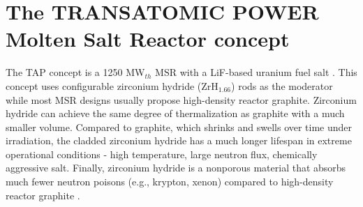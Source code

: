 \documentclass[12pt]{article} %
\begin{document}
\section{The TRANSATOMIC POWER Molten Salt Reactor concept}
The \gls{TAP} concept is a 1250 MW$_{th}$ \gls{MSR} with a LiF-based uranium 
fuel salt \cite{transatomic_power_corporation_technical_2016}. This concept 
uses configurable zirconium hydride (ZrH$_{1.66}$) rods as the moderator while 
most \gls{MSR} designs usually propose high-density reactor graphite. 
Zirconium hydride can achieve the same degree of thermalization as graphite 
with a much smaller volume. Compared to graphite, which shrinks and swells 
over time under irradiation, the cladded zirconium hydride has a much 
longer lifespan in extreme operational conditions - high temperature, large 
neutron flux, chemically aggressive salt. Finally, zirconium hydride is a 
nonporous material that absorbs much fewer neutron poisons (e.g., krypton, 
xenon) compared to high-density reactor graphite 
\cite{transatomic_power_corporation_technical_2016, 
transatomic_power_corporation_neutronics_2016, betzler_two-dimensional_2017}.
\end{document}
